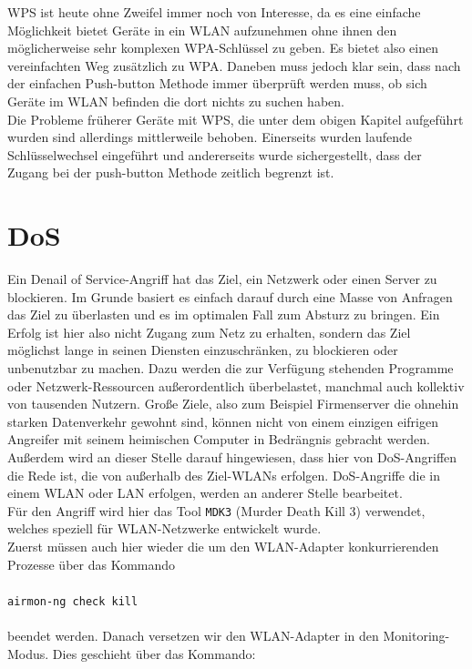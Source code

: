 WPS ist heute ohne Zweifel immer noch von Interesse, da es eine einfache Möglichkeit bietet Geräte in ein WLAN aufzunehmen ohne ihnen den möglicherweise sehr komplexen WPA-Schlüssel zu geben. Es bietet also einen vereinfachten Weg zusätzlich zu WPA. Daneben muss jedoch klar sein, dass nach der einfachen Push-button Methode immer überprüft werden muss, ob sich Geräte im WLAN befinden die dort nichts zu suchen haben. \\
Die Probleme früherer Geräte mit WPS, die unter dem obigen Kapitel aufgeführt wurden sind allerdings mittlerweile behoben. Einerseits wurden laufende Schlüsselwechsel eingeführt und andererseits wurde sichergestellt, dass der Zugang bei der push-button Methode zeitlich begrenzt ist. \\
\newpage

\section{DoS}
Ein Denail of Service-Angriff hat das Ziel, ein Netzwerk oder einen Server zu blockieren. Im Grunde basiert es einfach darauf durch eine Masse von Anfragen das Ziel zu überlasten und es im optimalen Fall zum Absturz zu bringen. Ein Erfolg ist hier also nicht Zugang zum Netz zu erhalten, sondern das Ziel möglichst lange in seinen Diensten einzuschränken, zu blockieren oder unbenutzbar zu machen. Dazu werden die zur Verfügung stehenden Programme oder Netzwerk-Ressourcen außerordentlich überbelastet, manchmal auch kollektiv von tausenden Nutzern. Große Ziele, also zum Beispiel Firmenserver die ohnehin starken Datenverkehr gewohnt sind, können nicht von einem einzigen eifrigen Angreifer mit seinem heimischen Computer in Bedrängnis gebracht werden. Außerdem wird an dieser Stelle darauf hingewiesen, dass hier von DoS-Angriffen die Rede ist, die von außerhalb des Ziel-WLANs erfolgen. DoS-Angriffe die in einem WLAN oder LAN erfolgen, werden an anderer Stelle bearbeitet. \\
Für den Angriff wird hier das Tool \colorbox{altgray}{\lstinline|MDK3|} (Murder Death Kill 3) verwendet, welches speziell für WLAN-Netzwerke entwickelt wurde. \\
Zuerst müssen auch hier wieder die um den WLAN-Adapter konkurrierenden Prozesse über das Kommando\\
\\
\colorbox{altgray}{\lstinline|airmon-ng check kill|}\\
\\
beendet werden.
Danach versetzen wir den WLAN-Adapter in den Monitoring-Modus. Dies geschieht über das Kommando:\\
